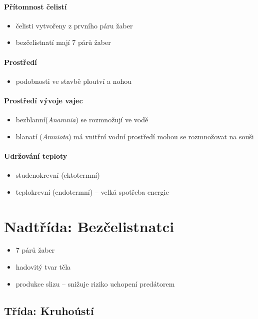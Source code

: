 \paragraph{Přítomnost čelistí}
\begin{itemize}
\item čelisti vytvořeny z prvního páru žaber
\item bezčelistnatí mají 7 párů žaber
\end{itemize}

\paragraph{Prostředí}
\begin{itemize}
\item podobnosti ve stavbě ploutví a nohou
\end{itemize}

\paragraph{Prostředí vývoje vajec}
\begin{itemize}
\item bezblanní(\textit{Anamnia}) se rozmnožují ve vodě
\item blanatí (\textit{Amniota}) má vnitřní vodní prostředí \ra mohou se rozmnožovat na souši
\end{itemize}

\paragraph{Udržování teploty}
\begin{itemize}
\item studenokrevní (ektotermní)
\item teplokrevní (endotermní) -- velká spotřeba energie
\end{itemize}

\newpage
\section{Nadtřída: Bezčelistnatci}
\begin{itemize}
\item 7 párů žaber
\item hadovitý tvar těla
\item produkce slizu -- snižuje riziko uchopení predátorem
\end{itemize}

\subsection{Třída: Kruhoústí}
